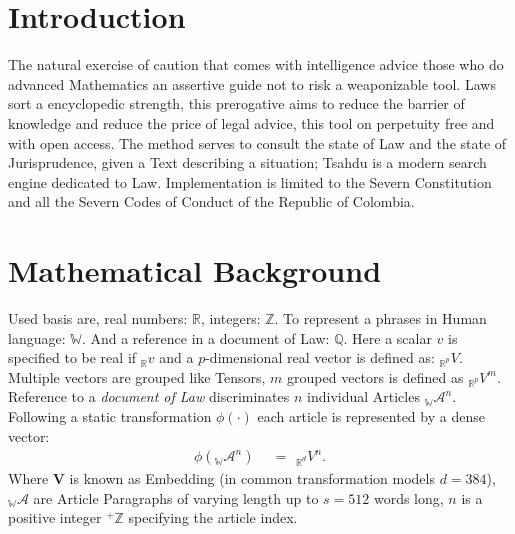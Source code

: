 \documentclass[a4paper,fleqn]{cas-sc}
\begin{document}
 \maketitle

\section{Introduction}
The natural exercise of caution that comes with intelligence advice 
those who do advanced Mathematics an assertive guide not to risk a weaponizable tool. 
Laws sort a encyclopedic strength, this prerogative aims to reduce the barrier of 
knowledge and reduce the price of legal advice, this tool on perpetuity free and with open access. 
\noindent
The method serves to consult the state of Law and the state of Jurisprudence, given a Text describing a situation; 
Tsahdu is a modern search engine dedicated to Law. 
Implementation is limited to the Severn Constitution and all the Severn Codes of Conduct of the Republic of Colombia. 

\section{Mathematical Background}
Used basis are, real numbers: $\mathbb{R}$, integers: $\mathbb{Z}$. To represent a phrases in Human language: $\mathbb{W}$. 
And a reference in a document of Law: $\mathbb{Q}$. Here a scalar $v$ is specified to be real if ${}_{\mathbb{R}}v$ and a 
$p$-dimensional real vector is defined as: ${}_{\mathbb{R}^{p}}V$. Multiple vectors are grouped like Tensors, 
$m$ grouped vectors is defined as ${}_{\mathbb{R}^{p}}V^{m}$.\\
\noindent
Reference to a \textit{document of Law} discriminates $n$ individual Articles ${}_{\mathbb{W}}\mathcal{A}^{n}$. \\

\noindent
Following a static transformation $\phi{}(\cdot)$ each article is represented by a dense vector: 
\begin{equation}
  \begin{split}
    \phi({}_{\mathbb{W}}\mathcal{A}^{n}) \hspace{5pt} &= \hspace{5pt} {}_{\mathbb{R}^{d}}V^{n}.
  \end{split}
\end{equation}
\noindent
Where $\mathbf{V}$ is known as Embedding (in common transformation models $d=384$), 
${}_{\mathbb{W}}\mathcal{A}$ are Article Paragraphs of varying length up to $s=512$ words long, 
$n$ is a positive integer ${}^{+}\mathbb{Z}$ specifying the article index. \\
\end{document}
